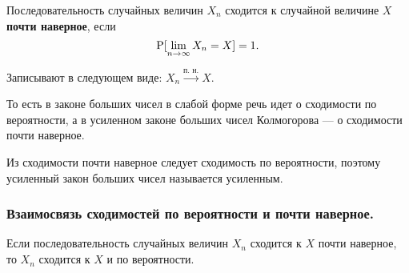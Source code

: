 \begin{definition*}
    Последовательность случайных величин $X_n$ сходится к случайной величине $X$ \textbf{почти наверное}, если
    \begin{equation*}
        \P[\lim_{n \to \infty} X_n = X] = 1.
    \end{equation*}

    Записывают в следующем виде: $X_n \xrightarrow{\text{п. н.}} X$.
\end{definition*}

То есть в законе больших чисел в слабой форме речь идет о сходимости по вероятности, а в усиленном законе больших чисел Колмогорова --- о сходимости почти наверное.

Из сходимости почти наверное следует сходимость по вероятности, поэтому усиленный закон больших чисел называется усиленным.

\subsubsection{Взаимосвязь сходимостей по вероятности и почти наверное.}

\begin{theorem*}
    Если последовательность случайных величин $X_n$ сходится к $X$ почти наверное, то $X_n$ сходится к $X$ и по вероятности.
\end{theorem*}

